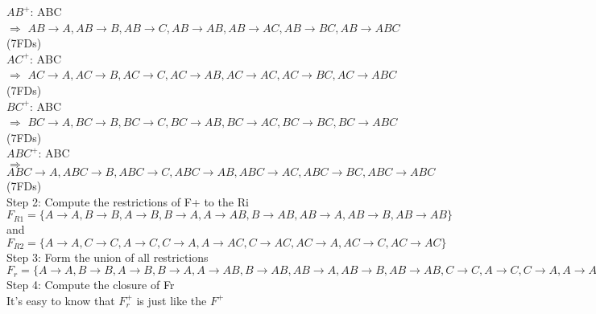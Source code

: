 \documentclass[]{article}
\begin{document}
	$AB^{+}$: ABC  \\
	
	$\Longrightarrow$ $AB\rightarrow A, AB\rightarrow B, AB\rightarrow C, AB\rightarrow AB, AB\rightarrow AC, AB\rightarrow BC, AB\rightarrow ABC$ (7FDs)  \\
	
	$AC^{+}$: ABC  \\
	
	$\Longrightarrow$ $AC\rightarrow A, AC\rightarrow B, AC\rightarrow C, AC\rightarrow AB, AC\rightarrow AC, AC\rightarrow BC, AC\rightarrow ABC$ (7FDs)  \\
	
	$BC^{+}$: ABC  \\
	
	$\Longrightarrow$ $BC\rightarrow A, BC\rightarrow B, BC\rightarrow C, BC\rightarrow AB, BC\rightarrow AC, BC\rightarrow BC, BC\rightarrow ABC$ (7FDs)  \\
	
	$ABC^{+}$: ABC  \\
	
	$\Longrightarrow$ $ABC\rightarrow A, ABC\rightarrow B, ABC\rightarrow C, ABC\rightarrow AB, ABC\rightarrow AC, ABC\rightarrow BC, ABC\rightarrow ABC$ (7FDs)  \\
	
	\noindent Step 2: Compute the restrictions of F+ to the Ri   \\
	
	$F_{R1} = \{A\rightarrow A, B\rightarrow B, A\rightarrow B, B\rightarrow A, A\rightarrow AB, B\rightarrow AB, AB\rightarrow A, AB\rightarrow B, AB\rightarrow AB\}$ and $F_{R2} = \{A\rightarrow A, C\rightarrow C, A\rightarrow C, C\rightarrow A, A\rightarrow AC, C\rightarrow AC, AC\rightarrow A, AC\rightarrow C, AC\rightarrow AC\}$  \\
	
	\noindent Step 3: Form the union of all restrictions   \\
	
	$F_{r} = \{A\rightarrow A, B\rightarrow B, A\rightarrow B, B\rightarrow A, A\rightarrow AB, B\rightarrow AB, AB\rightarrow A, AB\rightarrow B, AB\rightarrow AB, C\rightarrow C, A\rightarrow C, C\rightarrow A, A\rightarrow AC, C\rightarrow AC, AC\rightarrow A, AC\rightarrow C, AC\rightarrow AC\}$  \\
	
	\noindent Step 4: Compute the closure of Fr   \\
	
	It's easy to know that $F_{r}^{+}$ is just like the $F^{+}$ \\
\end{document}
